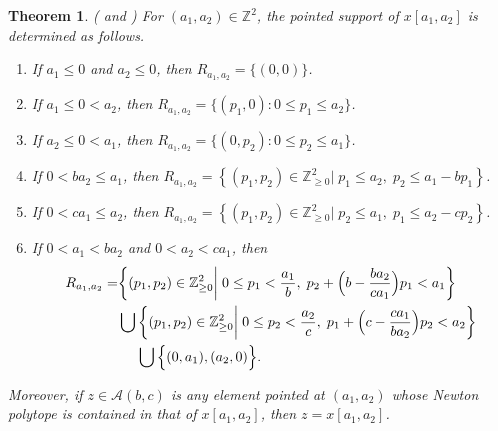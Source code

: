 \documentclass[10pt]{amsart}
\newtheorem{theorem}{Theorem}[section]
\theoremstyle{remark}
\numberwithin{equation}{section}
\newcommand{\ZZ}{\mathbb{Z}}
\newcommand{\cA}{\mathcal{A}}
\begin{document}
\begin{theorem}\label{th:pointed supports}(\cite[Proposition~4.1]{LLZ} and \cite[Corollary 3.5]{LLZ2})
  For $(a_1,a_2)\in\ZZ^2$, the pointed support of $x[a_1,a_2]$ is determined as follows.
  \begin{enumerate}
    \item If $a_1 \leq 0$ and $a_2 \leq 0$, then $R_{a_1,a_2} = \{(0,0)\}$.
    \item If $a_1 \leq 0 < a_2$, then $R_{a_1,a_2} = \{(p_1,0): 0 \leq p_1 \leq a_2\}$.
    \item If $a_2 \leq 0 < a_1$, then $R_{a_1,a_2} = \{(0,p_2): 0 \leq p_2 \leq a_1\}$.
    \item If $0<ba_2\leq a_1$, then $R_{a_1,a_2}=\left\{(p_1,p_2)\in\ZZ_{\ge0}^2\big|\; p_1\le a_{2},\; p_2\le a_{1}-bp_1\right\}$.
    \item If $0<ca_1\leq a_2$, then $R_{a_1,a_2}=\left\{(p_1,p_2)\in\ZZ_{\ge0}^2\big|\; p_2\le a_{1},\; p_1\le a_{2}-cp_2\right\}$.
    \item If $0 < a_1 < ba_2$ and $0 < a_2 < ca_1$, then
    $$\aligned
    R_{a_1,a_2}=&\bigg\{(p_1,p_2)\in\ZZ_{\ge0}^2\bigg|\; 0\le p_1<\frac{a_1}{b},\; p_2+\Big(b-\frac{ba_2}{ca_1}\Big)p_1<a_1\bigg\}\\
    &\bigcup\bigg\{(p_1,p_2)\in\ZZ_{\ge0}^2\bigg|\; 0\le p_2<\frac{a_2}{c},\; p_1+\Big(c-\frac{ca_1}{ba_2}\Big)p_2<a_2\bigg\}\\
    &\hspace{1.35em}\bigcup\Big\{(0,a_1),(a_2,0)\Big\}.
    \endaligned
    $$
  \end{enumerate}
  Moreover, if $z\in\cA(b,c)$ is any element pointed at $(a_1,a_2)$ whose Newton polytope is contained in that of $x[a_1,a_2]$, then $z=x[a_1,a_2]$. 
\end{theorem}
\end{document}
